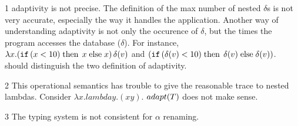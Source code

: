 \begin{mainitem}
\item[1] adaptivity is not precise. The definition of the max number
  of nested $\delta$s is not very accurate, especially the way it handles the
  application. Another way of understanding adaptivity is not only the
  occurence of $\delta$, but the times the program accesses the
  database ($\delta$).  For instance, $\lambda
  x. ( \mathtt{if} \, (x < 10 ) \mbox{\;then\;} \, x \mbox{\;else\;} x  ) \, \delta(v) $ and $
   ( \mathtt{if} \, ( \delta(v) < 10 ) \mbox{\;then\;} \, \delta(v) \mbox{\;else\;} \delta(v)  )
   $. should distinguish the two definition of adaptivity. \\
\item[2] This operational semantics has trouble to give the reasonable trace to
  nested lambdas. Consider $\lambda x. lambda y. (x y)$. $adapt(T)$
  does not make sense. \\
\item[3] The typing system is not consistent for $\alpha$ renaming.
  \end{mainitem}